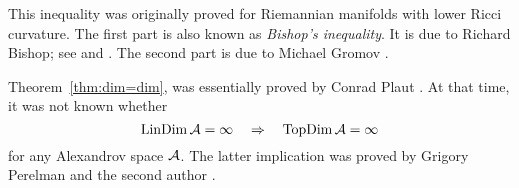 This inequality was originally proved for Riemannian manifolds with lower Ricci curvature.
The first part is also known as \emph{Bishop's inequality}.
It is due to Richard Bishop; see \cite{bishop1964} and \cite[Corollary 4, p. 256]{bishop-crittenden}.
The second part is due to Michael Gromov \cite{gromov1981}.

Theorem~\ref{thm:dim=dim}, was essentially proved by Conrad Plaut \cite{plaut:dimension}.
At that time, it was not known whether
\[\mathop{\rm LinDim}\nolimits\mathcal{A}=\infty\quad \Rightarrow\quad \mathop{\rm TopDim}\nolimits\mathcal{A}=\infty\]
for any Alexandrov space $\mathcal{A}$.
The latter implication was proved by Grigory Perelman and the second author \cite{perelman-petrunin:qg}.

